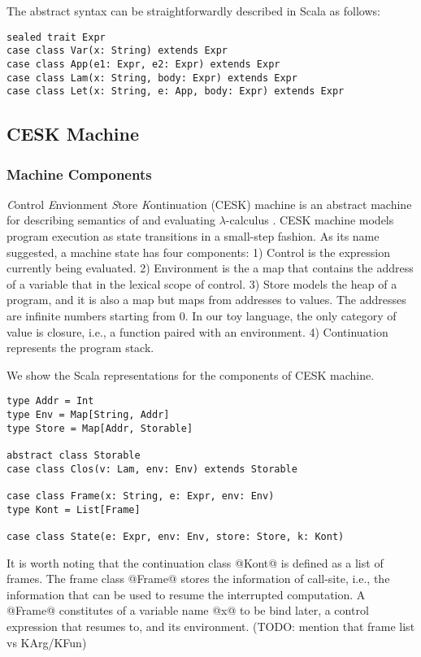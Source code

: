 \documentclass[acmsmall,review,anonymous]{acmart}\settopmatter{printfolios=true,printccs=false,printacmref=false}
\begin{document}
The abstract syntax can be straightforwardly described in Scala as follows:

\begin{lstlisting}
sealed trait Expr
case class Var(x: String) extends Expr
case class App(e1: Expr, e2: Expr) extends Expr
case class Lam(x: String, body: Expr) extends Expr
case class Let(x: String, e: App, body: Expr) extends Expr
\end{lstlisting}

\subsection{CESK Machine} \label{cesk}

\subsubsection{Machine Components}

\textit{C}ontrol \textit{E}nvionment \textit{S}tore \textit{K}ontinuation (CESK) machine is an
abstract machine for describing semantics of and evaluating $\lambda$-calculus \cite{felleisen1987calculus}.
CESK machine models program execution as state transitions in a small-step fashion. As its name suggested,
a machine state has four components: 1) Control is the expression currently being evaluated.
2) Environment is the a map that contains the address of a variable that in the lexical
scope of control.
3) Store models the heap of a program, and it is also a map but maps from addresses to values.
The addresses are infinite numbers starting from 0.
In our toy language, the only category of value is closure, i.e., a function paired with an environment.
4) Continuation represents the program stack.

We show the Scala representations for the components of CESK machine.

\begin{lstlisting}
type Addr = Int
type Env = Map[String, Addr]
type Store = Map[Addr, Storable]

abstract class Storable
case class Clos(v: Lam, env: Env) extends Storable

case class Frame(x: String, e: Expr, env: Env)
type Kont = List[Frame]

case class State(e: Expr, env: Env, store: Store, k: Kont)
\end{lstlisting}

It is worth noting that the continuation class @Kont@ is defined as a list of frames.
The frame class @Frame@ stores the information of call-site, i.e., the information that
can be used to resume the interrupted computation.
A @Frame@ constitutes of a variable name @x@ to be bind later, a control expression
that resumes to, and its environment. (TODO: mention that frame list vs KArg/KFun)
\end{document}
